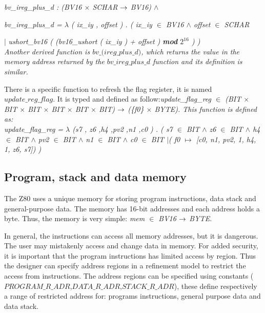\documentclass[a4paper]{llncs}
\begin{document}
\hspace*{0.0in}\it bv\_ireg\_plus\_d \rm : \rm(\it BV16  $\times$  \it SCHAR  $\rightarrow$  \it BV16\rm )  $\land$ 

\hspace*{0.0in}\it bv\_ireg\_plus\_d \rm =  $\lambda$  \rm ( \it ix\_iy \rm , \it offset \rm ) \rm . \rm ( \it ix\_iy  $\in$  \it BV16  $\land$  \it offset  $\in$  \it SCHAR   

\hspace*{0.20in}$\mid$ \it ushort\_bv16 \rm ( \rm (\it bv16\_ushort \rm ( \it ix\_iy \rm ) \rm + \it offset \rm ) 
\textbf{\textit{mod}} $2^{16}$ ) \rm )\\

Another derived function is  $\textit{bv\_(ireg\_plus\_d)}$, which returns the value in the memory  address
returned by the $\textit{bv\_ireg\_plus\_d}$ function and its definition is similar.

There is a specific function to refresh the flag register, it is named $\textit{update\_reg\_flag}$. It is typed and defined as follow:\it update\_flag\_reg \rm $\in$ \rm (\it BIT  $\times$  \it BIT  $\times$  \it BIT  $\times$  \it
BIT $\times$  \it BIT  $\times$  \it BIT\rm) $\rightarrow$  \rm (\rm \{\it f0\rm \}  $\times$  \it BYTE\rm ).  This function is defined as:\\

 \it update\_flag\_reg \rm =  $\lambda$  \rm (\it s7 \rm, \it z6 \rm,\it h4 \rm,\it pv2 \rm ,\it n1
\rm ,\it c0 \rm) . 
\rm ( \it s7 $\in$ \it BIT $\land$ \it z6 $\in$ \it BIT $\land$ \it h4 $\in$ \it BIT $\land$ \it pv2 $\in$ \it BIT $\land$ \it n1 $\in$ \it BIT $\land$ \it c0 $\in$ \it BIT \rm $\mid$( \it f0  $\mapsto$ \rm [\it c0\rm , \it n1\rm , \it pv2\rm , \rm 1\rm , \it h4\rm , \rm 1\rm , \it z6\rm , \it s7\rm \rm ]\rm ) \rm )


\subsection{Program, stack and data memory}

The Z80 uses a unique memory for storing program instructions, data stack and
general-purpose data. The memory has 16-bit addresses and each address holds a byte.
Thus, the memory is very simple: \it mem  $\in$  \it BV16  $\rightarrow$  \it BYTE\rm.
 
In general, the instructions can access all memory addresses, but it is dangerous. The user may mistakenly
access and change data in memory. For added  security, it is important that the program instructions has
limited access by region. Thus the designer can specify address regions in a refinement model to restrict the access from
instructions. The address regions can be specified using constants
($\textit{PROGRAM\_R\_ADR,DATA\_R\_ADR,STACK\_R\_ADR}$), these define respectively a range of restricted
address for: programs instructions, general purpose data and data stack.
%
\end{document}
